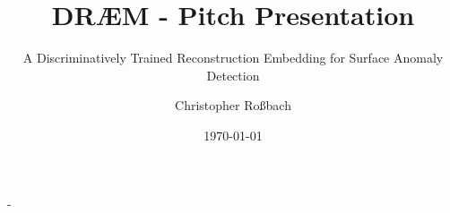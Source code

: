 \documentclass[final]{beamer}
\title[DRÆM Pitch]{DRÆM - Pitch Presentation}
\subtitle{A Discriminatively Trained Reconstruction Embedding for Surface Anomaly Detection}
\author[Christopher Roßbach]{
Christopher Roßbach\inst{1}}
\institute[FAU]{%
\inst{1} Friedrich-Alexander-Universität Erlangen-Nürnberg, Technische Fakultät
}
\date{\today}
\begin{document}
\begin{frame}[t,titleimage]{-}
\titlepage%
\end{frame}


\end{document}
